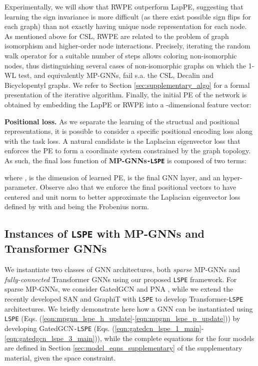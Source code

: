 \documentclass{article} \usepackage{iclr2021_conference,times}
\begin{document}
Experimentally, we will show that RWPE outperform LapPE, suggesting that learning the sign invariance is more difficult (as there exist  possible sign flips for each graph) than not exactly having unique node representation for each node. As mentioned above for CSL, RWPE are related to the problem of graph isomorphism and higher-order node interactions. Precisely, iterating the random walk operator for a suitable number of steps allows coloring non-isomorphic nodes, thus distinguishing several cases of non-isomorphic graphs on which the 1-WL test, and equivalently MP-GNNs, fail s.a. the CSL, Decalin and Bicyclopentyl graphs. We refer to Section \ref{sec:supplementary_algo} for a formal presentation of the iterative algorithm. Finally, the initial PE of the network is obtained by embedding the LapPE or RWPE into a -dimensional feature vector:







{\bf Positional loss.} As we separate the learning of the structual and positional representations, it is possible to consider a specific positional encoding loss along with the task loss. A natural candidate is the Laplacian eigenvector loss \citep{belkin2003laplacian, lai2014splitting} that enforces the PE to form a coordinate system constrained by the graph topology. As such, the final loss function of \textbf{MP-GNNs\texttt{-LSPE}} is composed of two terms:

where ,  is the dimension of learned PE,  is the final GNN layer, and  an hyper-parameter. Observe also that we enforce the final positional vectors  to have centered and unit norm  to better approximate the Laplacian eigenvector loss defined by  with  and  being the Frobenius norm.




\subsection{Instances of \texttt{LSPE} with MP-GNNs and Transformer GNNs}
\label{sec:instances_lspe}

We instantiate two classes of GNN architectures, both \textit{sparse} MP-GNNs and \textit{fully-connected} Transformer GNNs using our proposed \texttt{LSPE} framework. For sparse MP-GNNs, we consider GatedGCN \citep{bresson2017residual} and PNA \citep{corso2020principal}, while we extend the recently developed SAN \citep{kreuzer2021rethinking} and GraphiT \citep{mialon2021graphit} with \texttt{LSPE} to develop Transformer-\texttt{LSPE} architectures.
We briefly demonstrate here how a GNN can be instantiated using \texttt{LSPE} (Eqs. (\ref{eqn:mpgnn_lspe_h_update}-\ref{eqn:mpgnn_lspe_p_update})) by developing GatedGCN\texttt{-LSPE} (Eqs. (\ref{eqn:gatedcn_lspe_1_main}-\ref{eqn:gatedgcn_lspe_3_main})), while the complete equations for the four models are defined in Section \ref{sec:model_eqns_supplementary} of the supplementary material, given the space constraint.
\end{document}
